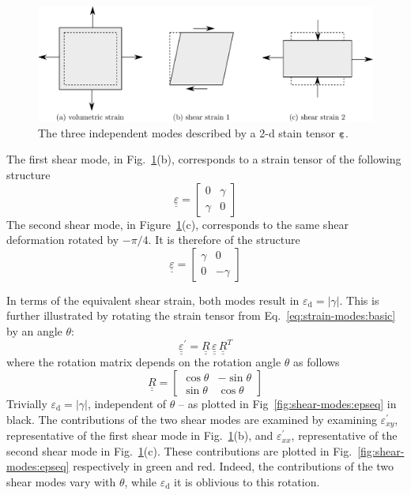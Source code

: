 \documentclass[times,namecite]{goose-article}
\newcommand\T[1]{\underline{\bm{{#1}}}}
\begin{document}
\begin{figure}[htp]
  \centering
  \includegraphics[width=.7\textwidth]{figures/strain-modes_2d}
  \caption{The three independent modes described by a 2-d stain tensor $\T{\varepsilon}$.}
  \label{fig:strain-modes:2d}
\end{figure}

The first shear mode, in Fig.~\ref{fig:strain-modes:2d}(b), corresponds to a strain tensor of the following structure
\begin{equation} \label{eq:strain-modes:basic}
  \underline{\underline{\varepsilon}}
  =
  \begin{bmatrix}
    0      & \gamma \\
    \gamma &  0
  \end{bmatrix}
\end{equation}
The second shear mode, in Figure~\ref{fig:strain-modes:2d}(c), corresponds to the same shear deformation rotated by $-\pi/4$. It is therefore of the structure
\begin{equation}
  \underline{\underline{\varepsilon}}
  =
  \begin{bmatrix}
    \gamma &  0      \\
     0     & -\gamma
  \end{bmatrix}
\end{equation}

In terms of the equivalent shear strain, both modes result in $\varepsilon_\mathrm{d} = | \gamma |$. This is further illustrated by rotating the strain tensor from Eq.~\eqref{eq:strain-modes:basic} by an angle $\theta$:
\begin{equation}
  \underline{\underline{\varepsilon}}^\prime
  =
  \underline{\underline{R}} \,
  \underline{\underline{\varepsilon}} \,
  \underline{\underline{R}}^T
\end{equation}
where the rotation matrix depends on the rotation angle $\theta$ as follows
\begin{equation}
  \underline{\underline{R}}
  =
  \begin{bmatrix}
    \cos \theta & - \sin \theta \\
    \sin \theta &   \cos \theta
  \end{bmatrix}
\end{equation}
Trivially $\varepsilon_\mathrm{d} = | \gamma |$, independent of $\theta$ -- as plotted in Fig~\ref{fig:shear-modes:epseq} in black. The contributions of the two shear modes are examined by examining $\varepsilon^\prime_{xy}$, representative of the first shear mode in Fig.~\ref{fig:strain-modes:2d}(b), and $\varepsilon^\prime_{xx}$, representative of the second shear mode in Fig.~\ref{fig:strain-modes:2d}(c). These contributions are plotted in Fig.~\ref{fig:shear-modes:epseq} respectively in green and red. Indeed, the contributions of the two shear modes vary with $\theta$, while $\varepsilon_\mathrm{d}$ it is oblivious to this rotation.
\end{document}

